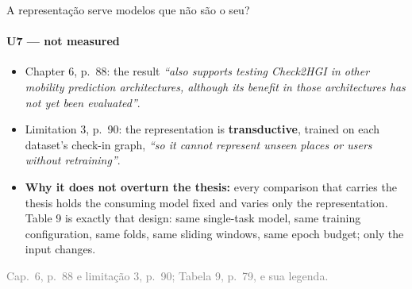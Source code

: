 \documentclass{beamer}
\begin{document}
\begin{frame}[noframenumbering]{A representação serve modelos que não são o seu?}
    \framesubtitle{U7 --- not measured}
    \hypertarget{u7}{}
    \small
    \begin{itemize}\setlength{\itemsep}{0pt}\setlength{\parskip}{0pt}
        \item Chapter 6, p.~88: the result \textit{``also supports testing Check2HGI in other mobility prediction architectures, although its benefit in those architectures has not yet been evaluated''}.
        \item Limitation 3, p.~90: the representation is \textbf{transductive}, trained on each dataset's check-in graph, \textit{``so it cannot represent unseen places or users without retraining''}.
        \item \textbf{Why it does not overturn the thesis:} every comparison that carries the thesis holds the consuming model fixed and varies only the representation. Table 9 is exactly that design: same single-task model, same training configuration, same folds, same sliding windows, same epoch budget; only the input changes.
    \end{itemize}
    \vfill
    {\scriptsize
    \begin{minipage}[b]{0.775\linewidth}\raggedright\textcolor{gray}{Cap.~6, p.~88 e limitação 3, p.~90; Tabela 9, p.~79, e sua legenda.}\end{minipage}\hfill
    \begin{minipage}[b]{0.20\linewidth}\raggedleft \hyperlink{b0}{}\end{minipage}}
\end{frame}
\end{document}
